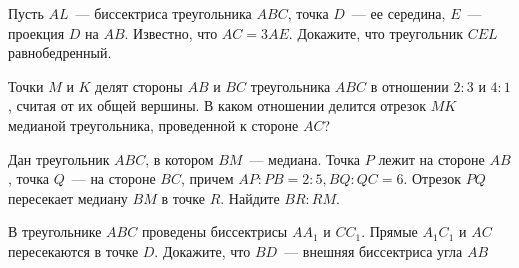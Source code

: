 \documentclass{article}
\begin{document}
\begin{enumerate_boxed}
        \item Пусть $AL$~--- биссектриса треугольника $ABC$, точка $D$~--- ее середина, $E$~--- проекция $D$ на $AB$.
        Известно, что $AC = 3AE$.
        Докажите, что треугольник $CEL$ равнобедренный.

        \item Точки $M$ и $K$ делят стороны $AB$ и $BC$ треугольника $ABC$ в отношении $2 : 3$ и $4 : 1$, считая от их общей вершины.
        В каком отношении делится отрезок $MK$ медианой треугольника, проведенной к стороне $AC$?

        \item Дан треугольник $ABC$, в котором $BM$~--- медиана.
        Точка $P$ лежит на стороне $AB$, точка $Q$~--- на стороне $BC$, причем $AP : PB = 2 : 5, BQ : QC = 6$.
        Отрезок $PQ$ пересекает медиану $BM$ в точке $R$.
        Найдите $BR:RM$.

        \item В треугольнике $ABC$ проведены биссектрисы $AA_1$ и $CC_1$.
        Прямые $A_{1}C_1$ и $AC$ пересекаются в точке $D$.
        Докажите, что $BD$~--- внешняя биссектриса угла $AB$

    \end{enumerate_boxed}
\end{document}

